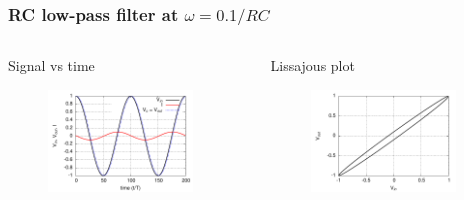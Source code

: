 \documentclass[beamer]{standalone}
\begin{document}
\begin{frame}
\frametitle{RC low-pass filter at $\omega=0.1/RC$}
\begin{columns}[c]
 \begin{column}{.55\textwidth}
  Signal vs time
  \begin{figure}
   \includegraphics[angle=0,width=0.90\textwidth]{./plots/i_v_vr_w=_1rc}
  \end{figure}
 \end{column}
 \begin{column}{.45\textwidth}
  Lissajous plot
  \begin{figure}
   \includegraphics[angle=0,width=0.90\textwidth]{./plots/vc_vs_vin_w=_1rc}
  \end{figure}
 \end{column}
\end{columns}
\end{frame}
\end{document}
